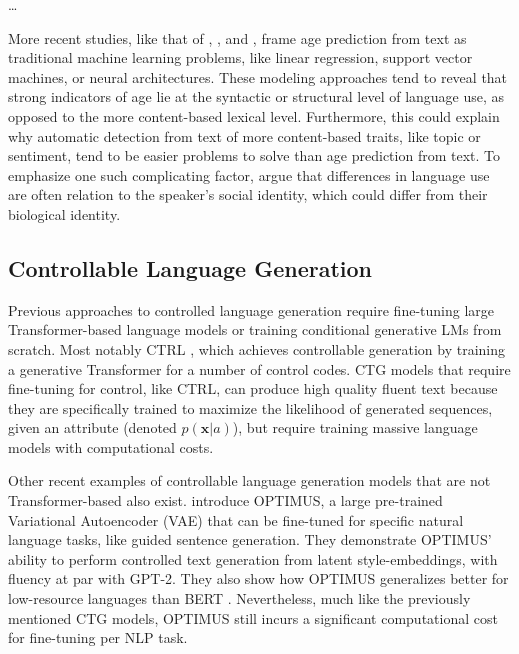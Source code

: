 \dots

More recent studies, like that of \cite{nguyen-etal-2011-author}, \cite{zheng2019personalized}, and \cite{abdallah2020age}, frame age prediction from text as traditional machine learning problems, like linear regression, support vector machines, or neural architectures. These modeling approaches tend to reveal that strong indicators of age lie at the syntactic or structural level of language use, as opposed to the more content-based lexical level. Furthermore, this could explain why automatic detection from text of more content-based traits, like topic or sentiment, tend to be easier problems to solve than age prediction from text. To emphasize one such complicating factor, \cite{nguyen2014gender} argue that differences in language use are often relation to the speaker's social identity, which could differ from their biological identity. 


\subsection{Controllable Language Generation}
Previous approaches to controlled language generation require fine-tuning large Transformer-based language models or training conditional generative LMs from scratch. Most notably CTRL \citep{keskarCTRL2019}, which achieves controllable generation by training a generative Transformer for a number of control codes. CTG models that require fine-tuning for control, like CTRL, can produce high quality fluent text because they are specifically trained to maximize the likelihood of generated sequences, given an attribute (denoted $p(\textbf{x} | a)$), but require training massive language models with computational costs.

Other recent examples of controllable language generation models that are not Transformer-based also exist. \cite{li-etal-2020-optimus} introduce OPTIMUS, a large pre-trained Variational Autoencoder (VAE) \citep{Kingma2014} that can be fine-tuned for specific natural language tasks, like guided sentence generation. They demonstrate OPTIMUS' ability to perform controlled text generation from latent style-embeddings, with fluency at par with GPT-2. They also show how OPTIMUS generalizes better for low-resource languages than BERT \citep{devlin-etal-2019-bert}. Nevertheless, much like the previously mentioned CTG models, OPTIMUS still incurs a significant computational cost for fine-tuning per NLP task.


